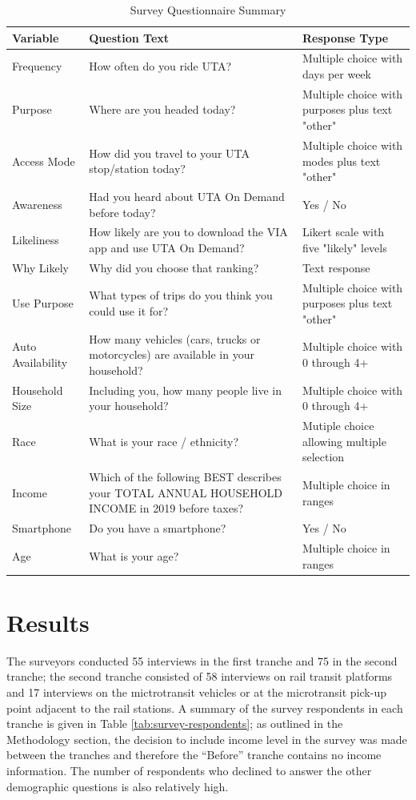 \documentclass[smartcities,article,submit,moreauthors,pdftex]{mdpi}
\begin{document}
\begin{table}

\caption{\label{tab:survey-questions}Survey Questionnaire Summary}
\centering
\begin{tabular}[t]{lp{}p{}}
\toprule
Variable & Question Text & Response Type\\
\midrule
Frequency & How often do you ride UTA? & Multiple choice with days per week\\
Purpose & Where are you headed today? & Multiple choice with purposes plus text "other"\\
Access Mode & How did you travel to your UTA stop/station today? & Multiple choice with modes plus text "other"\\
Awareness & Had you heard about UTA On Demand before today? & Yes / No\\
Likeliness & How likely are you to download the VIA app and use UTA On Demand? & Likert scale with five "likely" levels\\
\addlinespace
Why Likely & Why did you choose that ranking? & Text response\\
Use Purpose & What types of trips do you think you could use it for? & Multiple choice with purposes plus text "other"\\
Auto Availability & How many vehicles (cars, trucks or motorcycles) are available in your household? & Multiple choice with 0 through 4+\\
Household Size & Including you, how many people live in your household? & Multiple choice with 0 through 4+\\
Race & What is your race / ethnicity? & Mutiple choice allowing multiple selection\\
\addlinespace
Income & Which of the following BEST describes your TOTAL ANNUAL HOUSEHOLD INCOME in 2019 before taxes? & Multiple choice in ranges\\
Smartphone & Do you have a smartphone? & Yes / No\\
Age & What is your age? & Multiple choice in ranges\\
\bottomrule
\end{tabular}
\end{table}

\hypertarget{results}{%
\section{Results}\label{results}}

The surveyors conducted 55 interviews in the first tranche and 75 in the second
tranche; the second tranche consisted of 58 interviews on rail transit platforms
and 17 interviews on the mictrotransit vehicles or at the microtransit pick-up
point adjacent to the rail stations. A summary of the survey respondents in each
tranche is given in Table \ref{tab:survey-respondents}; as outlined in the
Methodology section, the decision to include income level in the survey was made
between the tranches and therefore the ``Before'' tranche contains no income
information. The number of respondents who declined to answer the other
demographic questions is also relatively high.
\end{document}
